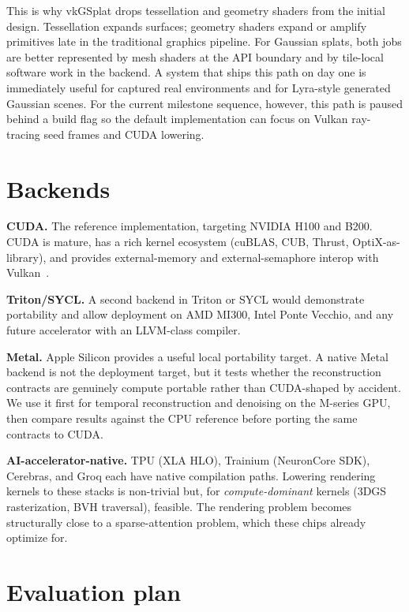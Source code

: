\documentclass[10pt,journal]{IEEEtran}
\begin{document}
This is why vkGSplat drops tessellation and geometry shaders from the
initial design. Tessellation expands surfaces; geometry shaders expand
or amplify primitives late in the traditional graphics pipeline. For
Gaussian splats, both jobs are better represented by mesh shaders at the
API boundary and by tile-local software work in the backend. A system
that ships this path on day one is immediately useful for captured real
environments and for Lyra-style generated Gaussian scenes. For the
current milestone sequence, however, this path is paused behind a build
flag so the default implementation can focus on Vulkan ray-tracing seed
frames and CUDA lowering.

\section{Backends}\label{sec:backends}

\textbf{CUDA.} The reference implementation, targeting NVIDIA H100 and
B200. CUDA is mature, has a rich kernel ecosystem (cuBLAS, CUB, Thrust,
OptiX-as-library), and provides external-memory and external-semaphore
interop with Vulkan~\cite{nvidia2020vkcuda}.

\textbf{Triton\slash SYCL.} A second backend in Triton or SYCL would
demonstrate portability and allow deployment on AMD MI300, Intel Ponte
Vecchio, and any future accelerator with an LLVM-class compiler.

\textbf{Metal.} Apple Silicon provides a useful local portability
target. A native Metal backend is not the deployment target, but it
tests whether the reconstruction contracts are genuinely compute
portable rather than CUDA-shaped by accident. We use it first for
temporal reconstruction and denoising on the M-series GPU, then compare
results against the CPU reference before porting the same contracts to
CUDA.

\textbf{AI-accelerator-native.} TPU (XLA HLO), Trainium (NeuronCore SDK),
Cerebras, and Groq each have native compilation paths. Lowering rendering
kernels to these stacks is non-trivial but, for \emph{compute-dominant}
kernels (3DGS rasterization, BVH traversal), feasible. The rendering
problem becomes structurally close to a sparse-attention problem, which
these chips already optimize for.

\section{Evaluation plan}
\end{document}
